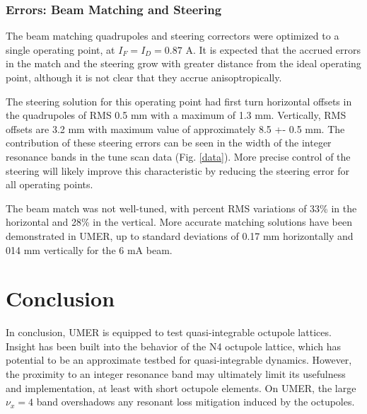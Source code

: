 \subsubsection{Errors: Beam Matching and Steering}
The beam matching quadrupoles and steering correctors were optimized to a single operating point, at $I_F=I_D = 0.87$ A. It is expected that the accrued errors in the match and the steering grow with greater distance from the ideal operating point, although it is not clear that they accrue anisoptropically.



The steering solution for this operating point had first turn horizontal offsets in the quadrupoles  of RMS 0.5 mm with a maximum of 1.3 mm. Vertically, RMS offsets are 3.2 mm with maximum value of approximately 8.5 +- 0.5 mm. The contribution of these steering errors can be seen in the width of the integer resonance bands in the tune scan data (Fig. \ref{data}). More precise control of the steering will likely improve this characteristic by reducing the steering error for all operating points.

The beam match was not well-tuned, with percent RMS variations of 33\% in the horizontal and 28\% in the vertical. More accurate matching solutions have been demonstrated in UMER, up to standard deviations of 0.17 mm horizontally and 014 mm vertically for the 6 mA beam. \cite{hao}



\section{Conclusion}

In conclusion, UMER is equipped to test quasi-integrable octupole lattices. Insight has been built into the behavior of the N4
octupole lattice, which has potential to be an approximate testbed for quasi-integrable dynamics. However, the proximity to an integer resonance band may ultimately limit its usefulness and implementation, at least with short octupole elements. On UMER, the large $\nu_x = 4$ band overshadows any resonant loss mitigation induced by the octupoles. 

